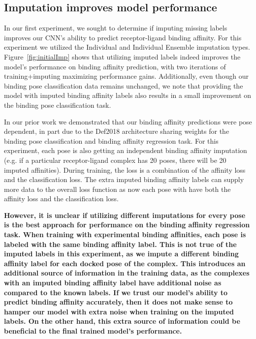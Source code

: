 \documentclass[journal=jcim,manuscript=article]{achemso}
\begin{document}
\subsection{Imputation improves model performance}
In our first experiment, we sought to determine if imputing missing labels improves our CNN's ability to predict receptor-ligand binding affinity.
For this experiment we utilized the Individual and Individual Ensemble imputation types.
Figure~\ref{fig:initialImp} shows that utilizing imputed labels indeed improves the model's performance on binding affinity prediction, with two iterations of training+imputing maximizing performance gains.
Additionally, even though our binding pose classification data remains unchanged, we note that providing the model with imputed binding affinity labels also results in a small improvement on the binding pose classification task.

In our prior work we demonstrated that our binding affinity predictions were pose dependent, in part due to the Def2018 architecture sharing weights for the binding pose classification and binding affinity regression task\cite{crossdocked2020}.
For this experiment, each pose is also getting an independent binding affinity imputation (e.g. if a particular receptor-ligand complex has 20 poses, there will be 20 imputed affinities).
During training, the loss is a combination of the affinity loss and the classification loss.
The extra imputed binding affinity labels can supply more data to the overall loss function as now each pose with have both the affinity loss and the classification loss.

\textbf{However, it is unclear if utilizing different imputations for every pose is the best approach for performance on the binding affinity regression task.
When training with experimental binding affinities, each pose is labeled with the same binding affinity label.
This is not true of the imputed labels in this experiment, as we impute a different binding affinity label for each docked pose of the complex.
This introduces an additional source of information in the training data, as the complexes with an imputed binding affinity label have additional noise as compared to the known labels.
If we trust our model's ability to predict binding affinity accurately, then it does not make sense to hamper our model with extra noise when training on the imputed labels.
On the other hand, this extra source of information could be beneficial to the final trained model's performance.}
\end{document}
